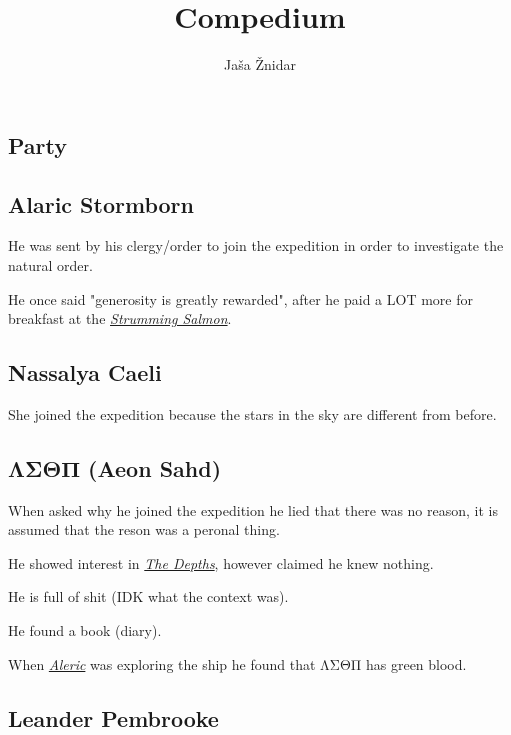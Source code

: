\documentclass{article}
\title{Compedium}
\author{Jaša Žnidar}
\begin{document}
\maketitle

\begin{multicols}{2}

    \section{Party}
    \label{party}

    \subsection{Alaric Stormborn}
    \label{aleric}

    He was sent by his clergy/order to join the expedition in order to investigate the natural order.

    He once said "generosity is greatly rewarded", after he paid a LOT more for breakfast at the \hyperref[strumming_salmon]{\textit{Strumming Salmon}}.

    \subsection{Nassalya Caeli}
    \label{nassalya}

    She joined the expedition because the stars in the sky are different from before.


    \subsection{ΛΣΘΠ (Aeon Sahd)}
    \label{aeon}

    When asked why he joined the expedition he lied that there was no reason, it is assumed that the reson was a peronal thing.

    He showed interest in \hyperref[depths]{\textit{The Depths}}, however claimed he knew nothing.

    He is full of shit (IDK what the context was).

    He found a book (diary).

    When \hyperref[aleric]{\textit{Aleric}} was exploring the ship he found that ΛΣΘΠ has green blood.

    \subsection{Leander Pembrooke}
    \label{leander}


\end{multicols}
\end{document}
